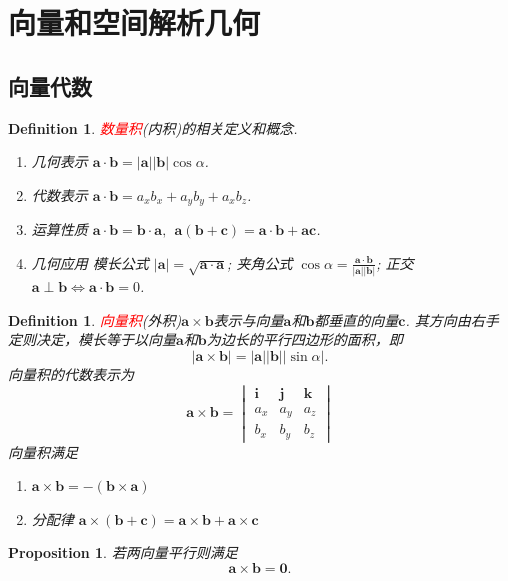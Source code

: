 \documentclass{article}
\newcommand{\mbf}[1]{\bm{#1}}
\newtheorem{proposition}[theorem]{Proposition}
\newtheorem{definition}[theorem]{Definition}
\newcommand{\redt}[1]{\textcolor{red}{#1}}
\begin{document}
\newpage
\section{向量和空间解析几何}

\subsection{向量代数}

\begin{definition}
\rm \redt{数量积}(内积)的相关定义和概念.
\begin{enumerate}
	\item 几何表示 $\mbf{a} \cdot \mbf{b} = |\mbf{a}| |\mbf{b}| \cos \alpha$.
	\item 代数表示 $\mbf{a} \cdot \mbf{b} = a_xb_x + a_yb_y + a_xb_z$.
	\item 运算性质 $\mbf{a} \cdot \mbf{b} = \mbf{b} \cdot \mbf{a},~~ \mbf{a}(\mbf{b} + \mbf{c}) = \mbf{a} \cdot \mbf{b} + \mbf{a}\mbf{c}$. 
	\item 几何应用 模长公式 $|\mbf{a}| = \sqrt{\mbf{a}\cdot\mbf{a}}$; 夹角公式 $\cos \alpha = \frac{\mbf{a}\cdot\mbf{b}}{|\mbf{a}||\mbf{b}|}$; 正交 $\mbf{a} \perp \mbf{b} \Leftrightarrow \mbf{a}\cdot\mbf{b} = 0$. 
\end{enumerate}
\end{definition}

\begin{definition}
\rm \redt{向量积}(外积)$\mbf{a}\times \mbf{b}$表示与向量$\mbf{a}$和$\mbf{b}$都垂直的向量$\mbf{c}$. 其方向由右手定则决定，模长等于以向量$\mbf{a}$和$\mbf{b}$为边长的平行四边形的面积，即
$$
|\mbf{a} \times \mbf{b}| = |\mbf{a}||\mbf{b}||\sin\alpha|. 
$$
向量积的代数表示为
$$
\mbf{a}\times\mbf{b} = \begin{vmatrix}
\mbf{i} & \mbf{j} & \mbf{k} \\
a_x & a_y & a_z \\
b_x & b_y & b_z 
\end{vmatrix}
$$
向量积满足
\begin{enumerate}
\item $\mbf{a} \times \mbf{b} = - (\mbf{b} \times \mbf{a})$
\item 分配律 $\mbf{a} \times (\mbf{b}+\mbf{c}) = \mbf{a}\times\mbf{b} +  \mbf{a}\times\mbf{c}$
\end{enumerate}

\end{definition}

\begin{proposition}
\rm 若两向量平行则满足
$$
\mbf{a} \times \mbf{b} = \mbf{0}.
$$
\end{proposition}
\end{document}

